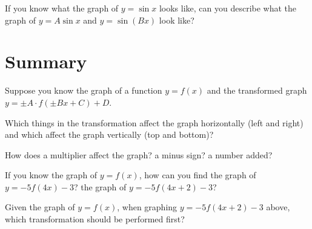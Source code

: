 \documentclass[number]{ximera}
\begin{document}
\begin{question}
If you know what the graph of $y = \sin x$ looks like, can you describe what the graph of $y = A \sin x$ and $y = \sin (Bx)$ look like?
\end{question}

\section{Summary}

Suppose you know the graph of a function $y = f(x)$ and the transformed graph $y = \pm A \cdot f(\pm Bx + C) +D$.

\begin{question}
Which things in the transformation affect the graph horizontally (left and right) and which affect the graph vertically (top and bottom)?
\end{question}

\begin{question}
How does a multiplier affect the graph? a minus sign? a number added? 
\end{question}

\begin{question}
If you know the graph of $y = f(x)$, how can you find the graph of $y = -5 f(4x) - 3$? the graph of $y = -5 f(4x + 2) - 3$? 
\end{question}

\begin{question}
Given the graph of $y=f(x)$, when graphing $y = -5 f(4x + 2) - 3$ above, which transformation should be performed first?
\begin{multipleChoice}
\end{multipleChoice}

\end{question}
\end{document}
